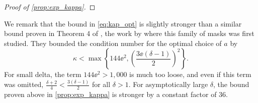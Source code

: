 \begin{proof}[Proof of \cref{prop:exp_kappa}]
\end{proof}

We remark that the bound in \eqref{eq:kap_opt} is slightly stronger than a similar bound proven in Theorem 4 of \cite{IVW2015_FastPhase}, the work by \citeauthor*{IVW2015_FastPhase} where this family of masks was first studied.  They bounded the condition number for the optimal choice of $a$ by \[\kappa < \max\left\{144 \ee^2, \left(\frac{3 \ee (\delta - 1)}{2}\right)^2 \right\}.\]  For small delta, the term $144 \ee^2 > 1,000$ is much too loose, and even if this term was omitted, $\frac{\delta + 2}{4} < \frac{3(\delta - 1)}{2}$ for all $\delta > 1$.  For asymptotically large $\delta$, the bound proven above in \cref{prop:exp_kappa} is stronger by a constant factor of $36$.

